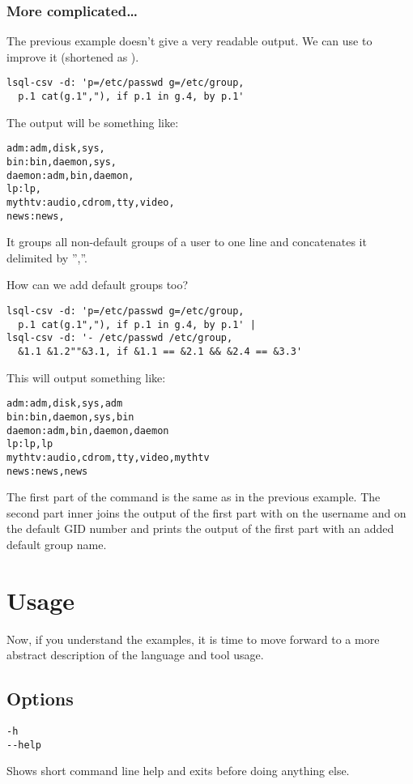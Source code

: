 \subsubsection{More complicated\ldots}
The previous example doesn't give a very readable output. We can use  to improve it (shortened as ).
\begin{verbatim}
lsql-csv -d: 'p=/etc/passwd g=/etc/group, 
  p.1 cat(g.1","), if p.1 in g.4, by p.1'
\end{verbatim}
The output will be something like:
\begin{verbatim}
adm:adm,disk,sys,
bin:bin,daemon,sys,
daemon:adm,bin,daemon,
lp:lp,
mythtv:audio,cdrom,tty,video,
news:news,
\end{verbatim}
It groups all non-default groups of a user to one line and concatenates it delimited by '',''.

How can we add default groups too?
\begin{verbatim}
lsql-csv -d: 'p=/etc/passwd g=/etc/group, 
  p.1 cat(g.1","), if p.1 in g.4, by p.1' |
lsql-csv -d: '- /etc/passwd /etc/group, 
  &1.1 &1.2""&3.1, if &1.1 == &2.1 && &2.4 == &3.3'
\end{verbatim}
This will output something like:
\begin{verbatim}
adm:adm,disk,sys,adm
bin:bin,daemon,sys,bin
daemon:adm,bin,daemon,daemon
lp:lp,lp
mythtv:audio,cdrom,tty,video,mythtv
news:news,news
\end{verbatim}

The first part of the command is the same as in the previous example. The second part inner joins the output
of the first part with  on the username and  on the default GID number and prints
the output of the first part with an added default group name.



\section{Usage}
Now, if you understand the examples, it is time to move forward to a more abstract description of the language and tool usage.

\subsection{Options}
\begin{verbatim}
-h
--help
\end{verbatim}
Shows short command line help and exits before doing anything else.

